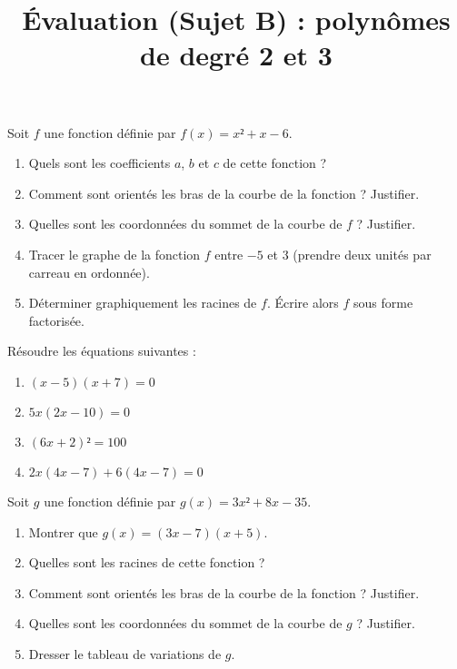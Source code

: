 \documentclass[
	classe=$1^{ere}STI2D$,
	headerTitle=Évaluation\space Chapitre\space 4
]{évaluation}
\begin{document}
\begin{exercice}
	Soit $f$ une fonction définie par $f(x) = x² + x - 6$.
	\begin{enumerate}
		\item Quels sont les coefficients $a$, $b$ et $c$ de cette fonction ?
		\item Comment sont orientés les bras de la courbe de la fonction ? Justifier.
		\item Quelles sont les coordonnées du sommet de la courbe de $f$ ? Justifier.
		\item Tracer le graphe de la fonction $f$ entre $-5$ et $3$ (prendre deux unités par carreau en ordonnée).
		\item Déterminer graphiquement les racines de $f$. Écrire alors $f$ sous forme factorisée.
	\end{enumerate}
\end{exercice}

\begin{exercice}
	Résoudre les équations suivantes :
	\begin{enumerate}
		\item $(x - 5)(x + 7) = 0$
		\item $5x(2x - 10) = 0$
		\item $(6x + 2)² = 100$
		\item $2x(4x - 7) + 6(4x - 7) = 0$
	\end{enumerate}
\end{exercice}

\begin{exercice}
	Soit $g$ une fonction définie par $g(x) = 3x² + 8x - 35$.
	\begin{enumerate}
		\item Montrer que $g(x) = (3x - 7)(x + 5)$.
		\item Quelles sont les racines de cette fonction ?
		\item Comment sont orientés les bras de la courbe de la fonction ? Justifier.
		\item Quelles sont les coordonnées du sommet de la courbe de $g$ ? Justifier.
		\item Dresser le tableau de variations de $g$.
	\end{enumerate}
\end{exercice}

\newpage
\setcounter{exercice}{1}

\title{Évaluation (Sujet B) : polynômes de degré 2 et 3}
\maketitle
\end{document}
